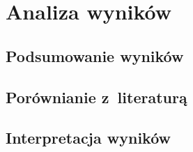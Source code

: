 

\section{Analiza wyników}

\subsection{Podsumowanie wyników}

\subsection{Porównianie z~literaturą}

\subsection{Interpretacja wyników}

